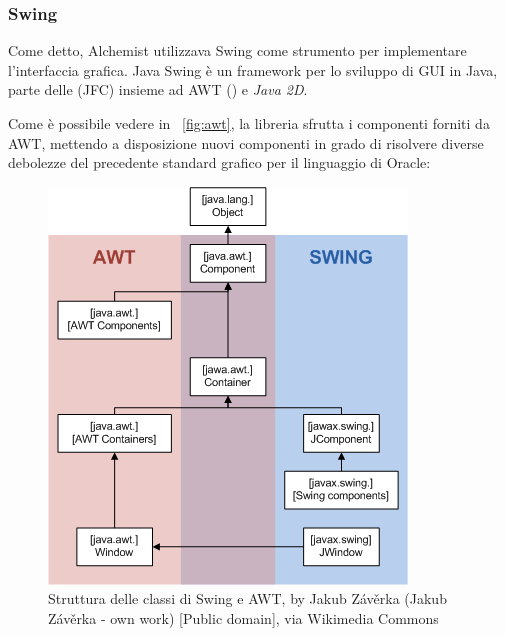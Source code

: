            \subsubsection{Swing}\label{subsub:swing}
                Come detto, Alchemist utilizzava Swing come strumento per implementare l'interfaccia grafica. Java Swing è un framework per lo sviluppo di GUI in Java, parte delle  (JFC) insieme ad AWT () e \emph{Java 2D}.

                Come è possibile vedere in \figurename~\vref{fig:awt}, la libreria sfrutta i componenti forniti da AWT, mettendo a disposizione nuovi componenti in grado di risolvere diverse debolezze del precedente standard grafico per il linguaggio di Oracle:

                \begin{figure}[htbp]
                    \centering
                    \includegraphics[scale=.45]{img/AWTSwing}
                    \caption{Struttura delle classi di Swing e AWT, by Jakub Závěrka (Jakub Závěrka - own work) [Public domain], via Wikimedia Commons}
                    \label{fig:awt}
                \end{figure}

